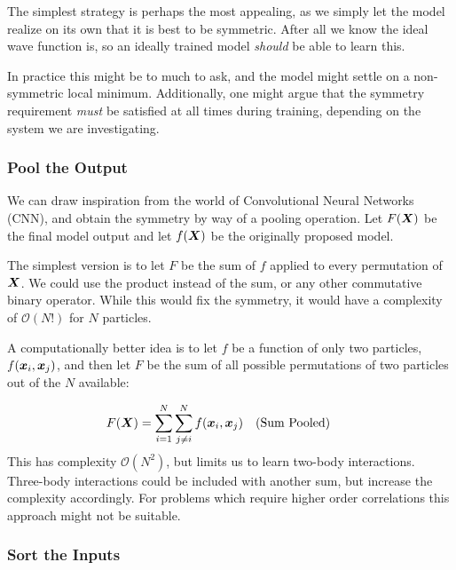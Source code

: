 \documentclass[Thesis.tex]{subfiles}
\begin{document}
The simplest strategy is perhaps the most appealing, as we simply let the model
realize on its own that  it is best to be symmetric. After all we know the ideal
wave function is, so an ideally trained model \emph{should} be able to learn
this.

In practice this might be to much to ask, and the model might settle on a
non-symmetric local minimum. Additionally, one might argue that the symmetry
requirement \emph{must} be satisfied at all times during training, depending on
the system we are investigating.


\subsubsection{Pool the Output}

We can draw inspiration from the world of Convolutional Neural Networks (CNN),
and obtain the symmetry by way of a pooling operation. Let $F(\bm{X})$ be the final
model output and let $f(\bm{X})$ be the originally proposed model.

The simplest version is to let $F$ be the sum of $f$ applied to every
permutation of $\bm{X}$. We could use the product instead of the sum, or any other
commutative binary operator. While this would fix the symmetry, it would have a
complexity of $\mathcal{O}(N!)$ for $N$ particles.

A computationally better idea is to let $f$ be a function of only two particles,
$f(\bm{x}_i, \bm{x}_j)$, and then let $F$ be the sum of all possible permutations of
two particles out of the $N$ available:

\begin{align}
  \label{eq:sum-pooling}
  F(\vX) &= \sum_{i=1}^N\sum_{j\neq i}^N f(\vx_i, \vx_j)\qq{(Sum Pooled)}
\end{align}
This has complexity $\mathcal{O}(N^2)$, but limits us to learn
two-body interactions. Three-body interactions could be included with another
sum, but increase the complexity accordingly. For problems which require higher
order correlations this approach might not be suitable.

\subsubsection{Sort the Inputs}
\label{sec:sorting-inputs-symmetry}
\end{document}
